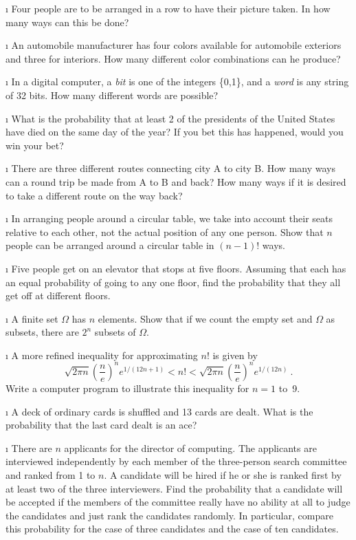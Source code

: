 \exercises
\begin{LJSItem}

\i\label{exer 3.1.1} Four people are to be arranged in a row to have their picture
taken.  In how many ways can this be done?

\i\label{exer 3.1.2} An automobile manufacturer has four colors available for
automobile exteriors and three for interiors.  How many different color combinations
can he produce?

\i\label{exer 3.1.3} In a digital computer, a {\em bit} is one of the integers
\{0,1\}, and a {\em word} is any string of 32 bits.  How many different words are
possible?

\i\label{exer 3.1.4} What is the probability that at least 2 of the presidents of
the United States have died on the same day of the year?  If you bet this has happened,
would you win your bet?

\i\label{exer 3.1.5} There are three different routes connecting city A to city B. 
How many ways can a round trip be made from A to B and back?  How many ways if it is
desired to take a different route on the way back?

\i\label{exer 3.1.6} In arranging people around a circular table, we take into
account their seats relative to each other, not the actual position of any one
person.  Show that $n$ people can be arranged around a circular table in $(n - 1)!$
ways.

\i\label{exer 3.1.7} Five people get on an elevator that stops at five floors. 
Assuming that each has an equal probability of going to any one floor, find the
probability that they all get off at different floors.

\i\label{exer 3.1.8} A finite set $\Omega$ has $n$ elements.  Show that if we count
the empty set and $\Omega$ as subsets, there are $2^n$ subsets of $\Omega$.

\i\label{exer 3.1.9} A more refined inequality for approximating $n!$ is given by
$$
\sqrt{2\pi n}\left(\frac ne\right)^n e^{1/(12n + 1)} < n! < \sqrt{2\pi n}\left(\frac
ne\right)^n e^{1/(12n)}\ .
$$ Write a computer program to illustrate this inequality for $n = 1$ to~9.

\i\label{exer 3.1.10} A deck of ordinary cards is shuffled and 13 cards are dealt. 
What is the probability that the last card dealt is an ace?

\i\label{exer 3.1.11} There are $n$ applicants for the director of computing.  The
applicants are interviewed independently by each member of the three-person search
committee and ranked from 1 to $n$.  A candidate will be hired if he or she is ranked
first by at least two of the three interviewers.  Find the probability that a
candidate will be accepted if the members of the committee really have no ability at
all to judge the candidates and just rank the candidates randomly.  In particular,
compare this probability for the case of three candidates and the case of ten
candidates.


\end{LJSItem}
